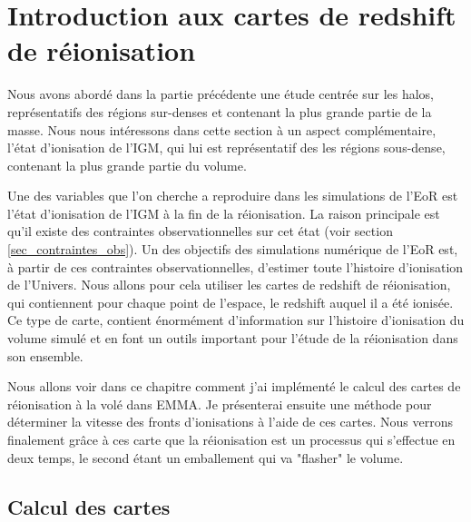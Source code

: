 \chapter{Introduction aux cartes de redshift de réionisation}
\label{sec:intre:zreio}

Nous avons abordé dans la partie précédente une étude centrée sur les halos, représentatifs des régions sur-denses et contenant la plus grande partie de la masse.
Nous nous intéressons dans cette section à un aspect complémentaire, l'état d'ionisation de l'\ac{IGM}, qui lui est représentatif des les régions sous-dense, contenant la plus grande partie du volume.

Une des variables que l'on cherche a reproduire dans les simulations de l'\ac{EoR} est l'état d'ionisation de l'\ac{IGM} à la fin de la réionisation.
La raison principale est qu'il existe des contraintes observationnelles sur cet état (voir section \ref{sec_contraintes_obs}).
Un des objectifs des simulations numérique de l'\ac{EoR} est, à partir de ces contraintes observationnelles, d'estimer toute l'histoire d'ionisation de l'Univers.
Nous allons pour cela utiliser les cartes de redshift de réionisation, qui contiennent pour chaque point de l'espace, le redshift auquel il a été ionisée.
Ce type de carte, contient énormément d'information sur l'histoire d'ionisation du volume simulé et en font un outils important pour l'étude de la réionisation dans son ensemble.

Nous allons voir dans ce chapitre comment j'ai implémenté le calcul des cartes de réionisation à la volé dans EMMA.
Je présenterai ensuite une méthode pour déterminer la vitesse des fronts d’ionisations à l'aide de ces cartes.
Nous verrons finalement grâce à ces carte que la réionisation est un processus qui s'effectue en deux temps, le second étant un emballement qui va "flasher" le volume.




\section{Calcul des cartes}
\label{sec:zmapcompute}


